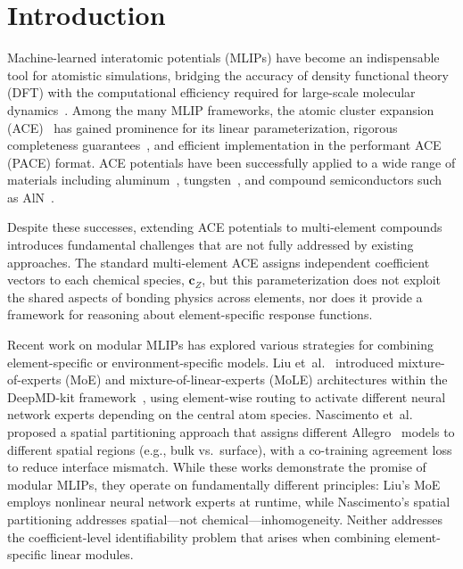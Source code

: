 \documentclass[twoside,prb,aps,floatfix,superscriptaddress,longbibliography]{revtex4-2}
\begin{document}
\maketitle

\section{Introduction}
\label{sec:intro}

Machine-learned interatomic potentials (MLIPs) have become an indispensable tool for atomistic simulations, bridging the accuracy of density functional theory (DFT) with the computational efficiency required for large-scale molecular dynamics~\cite{Shapeev2016MTP,Drautz2019ACE,Batatia2022MACE}. Among the many MLIP frameworks, the atomic cluster expansion (ACE)~\cite{Drautz2019ACE,Lysogorskiy2021PACE} has gained prominence for its linear parameterization, rigorous completeness guarantees~\cite{Dusson2022ACE}, and efficient implementation in the performant ACE (PACE) format. ACE potentials have been successfully applied to a wide range of materials including aluminum~\cite{Kovacs2021Al}, tungsten~\cite{Byggmastar2020W}, and compound semiconductors such as AlN~\cite{Yang2024AlNACE}.

Despite these successes, extending ACE potentials to multi-element compounds introduces fundamental challenges that are not fully addressed by existing approaches. The standard multi-element ACE assigns independent coefficient vectors to each chemical species, $\mathbf{c}_Z$, but this parameterization does not exploit the shared aspects of bonding physics across elements, nor does it provide a framework for reasoning about element-specific response functions.

Recent work on modular MLIPs has explored various strategies for combining element-specific or environment-specific models. Liu et~al.~\cite{Liu2026ScalingMoE} introduced mixture-of-experts (MoE) and mixture-of-linear-experts (MoLE) architectures within the DeepMD-kit framework~\cite{Wang2018DeepMD}, using element-wise routing to activate different neural network experts depending on the central atom species. Nascimento et~al.~\cite{Nascimento2026MoEFramework} proposed a spatial partitioning approach that assigns different Allegro~\cite{Musaelian2023Allegro} models to different spatial regions (e.g., bulk vs.\ surface), with a co-training agreement loss to reduce interface mismatch. While these works demonstrate the promise of modular MLIPs, they operate on fundamentally different principles: Liu's MoE employs nonlinear neural network experts at runtime, while Nascimento's spatial partitioning addresses spatial---not chemical---inhomogeneity. Neither addresses the coefficient-level identifiability problem that arises when combining element-specific linear modules.
\end{document}
